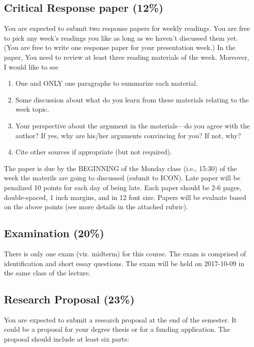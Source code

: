 \documentclass[11pt,]{article}
\providecommand{\tightlist}{%
  \setlength{\itemsep}{0pt}\setlength{\parskip}{0pt}}
\theoremstyle{definition}
\theoremstyle{definition}
\theoremstyle{remark}
\begin{document}
\subsection{Critical Response paper
(12\%)}\label{critical-response-paper-12}

You are expected to submit two response papers for weekly readings. You
are free to pick any week's readings you like as long as we haven't
discussed them yet. (You are free to write one response paper for your
presentation week.) In the paper, You need to review at least three
reading materials of the week. Moreover, I would like to see

\begin{enumerate}
\def\labelenumi{\arabic{enumi}.}
\tightlist
\item
  One and ONLY one paragraphs to summarize each material.
\item
  Some discussion about what do you learn from these materials relating
  to the week topic.
\item
  Your perspective about the argument in the materials---do you agree
  with the author? If yes, why are his/her arguments convincing for you?
  If not, why?
\item
  Cite other sources if appropriate (but not required).
\end{enumerate}

The paper is due by the BEGINNING of the Monday class (i.e., 15:30) of
the week the materils are going to discussed (submit to ICON). Late
paper will be penalized 10 points for each day of being late. Each paper
should be 2-6 pages, double-spaced, 1 inch margins, and in 12 font size.
Papers will be evaluate based on the above points (see more details in
the attached rubric).

\subsection{Examination (20\%)}\label{examination-20}

There is only one exam (viz. midterm) for this course. The exam is
comprised of identification and short essay questions. The exam will be
held on 2017-10-09 in the same class of the lecture.

\subsection{Research Proposal (23\%)}\label{research-proposal-23}

You are expected to submit a research proposal at the end of the
semester. It could be a proposal for your degree thesis or for a funding
application. The proposal should include at least six parts:
\end{document}
